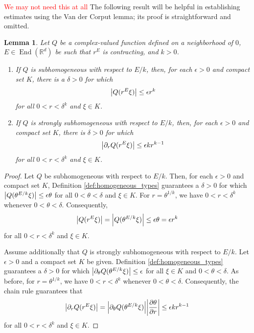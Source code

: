 \documentclass[11pt]{article}
\newtheorem{lemma}[theorem]{Lemma}
\newcommand\End{\operatorname{End}} %
\newcommand{\p}{\partial}
\newcommand{\f}[2]{\frac{#1}{#2}}
\begin{document}
\textcolor{red}{We may not need this at all} The following result will be helpful in establishing estimates using the Van der Corput lemma; its proof is straightforward and omitted.
\begin{lemma}\label{lem:ScalingofSubHomogeneous}
Let $Q$ be a complex-valued function defined on a neighborhood of $0$, $E\in\End(\mathbb{R}^d)$ be such that $r^E$ is contracting, and $k>0$.
\begin{enumerate}
\item If $Q$ is subhomogeneous with respect to $E/k$, then, for each $\epsilon>0$ and compact set $K$, there is a $\delta>0$ for which 
\begin{equation*}
\abs{Q(r^{E}\xi)}\leq \epsilon r^k
\end{equation*}
for all $0<r<\delta^k$ and $\xi\in K$.
\item If $Q$ is strongly subhomogeneous with respect to $E/k$, then, for each $\epsilon>0$ and compact set $K$, there is $\delta>0$ for which
\begin{equation*}
\abs{\partial_r Q(r^E\xi)}\leq \epsilon k  r^{k-1}
\end{equation*}
for all $0<r<\delta^k$ and $\xi\in K$.
\end{enumerate}
\end{lemma}
\begin{proof}
Let $Q$ be subhomogeneous with respect to $E/k$. Then, for each $\epsilon > 0$ and compact set $K$, Definition \ref{def:homogeneous_types} guarantees a $\delta> 0$ for which 
$\abs{Q(\theta^{E/k} \xi)} \leq \epsilon \theta$ for all $0 < \theta < \delta$ and $\xi \in K$. For $r = \theta^{1/k}$, we have $0<r<\delta^k$ whenever $0<\theta<\delta$. Consequently,
\begin{equation*}
    \abs{Q(r^E \xi)} =\abs{Q(\theta^{E/k}\xi)} \leq \epsilon \theta= \epsilon r^k
\end{equation*}
for all $0 < r < \delta^k$ and $\xi \in K$. 

Assume additionally that $Q$ is strongly subhomogeneous with respect to $E/k$. Let $\epsilon > 0$ and a compact set $K$ be given. Definition \ref{def:homogeneous_types} guarantees a $\delta> 0$ for which $\abs{\p_\theta Q(\theta^{E/k} \xi)} \leq \epsilon$ for all $\xi \in K$ and $0 < \theta < \delta$. As before, for $r = \theta^{1/k}$, we have $0<r<\delta^k$ whenever $0<\theta<\delta$. Consequently, the chain rule guarantees that
\begin{equation*}
    \abs{\p_r Q(r^{E} \xi)} = \abs{\p_\theta Q(\theta^{E/k} \xi)} 
    \abs{\f{\p \theta}{\p r}} \leq \epsilon k  r^{k-1}
\end{equation*}
for all $0 < r < \delta^k$ and $\xi \in K$. 
\end{proof}
\end{document}
